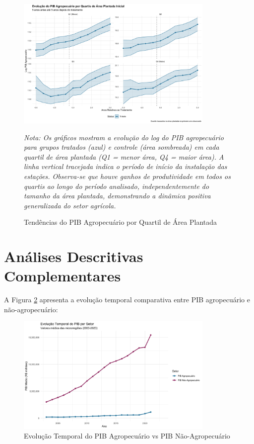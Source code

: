 \documentclass[
	12pt,				%
	oneside,			%
	a4paper,			%
	english,			%
	french,				%
	spanish,			%
	brazil				%
	]{abntex2}
\begin{document}
\begin{apendicesenv}
\begin{figure}[h]
\centering
\caption{Tendências do PIB Agropecuário por Quartil de Área Plantada}
\label{fig:trends_quartile}
\includegraphics[width=0.85\textwidth]{../../../data/outputs/additional_figures/trends_by_size_quartile.png}

\textit{Nota: Os gráficos mostram a evolução do log do PIB agropecuário para grupos tratados (azul) e controle (área sombreada) em cada quartil de área plantada (Q1 = menor área, Q4 = maior área). A linha vertical tracejada indica o período de início da instalação das estações. Observa-se que houve ganhos de produtividade em todos os quartis ao longo do período analisado, independentemente do tamanho da área plantada, demonstrando a dinâmica positiva generalizada do setor agrícola.}
\end{figure}

\section{Análises Descritivas Complementares}

A Figura \ref{fig:evolucao_pib} apresenta a evolução temporal comparativa entre PIB agropecuário e não-agropecuário:

\begin{figure}[h]
\centering
\caption{Evolução Temporal do PIB Agropecuário vs PIB Não-Agropecuário}
\label{fig:evolucao_pib}
\includegraphics[width=0.85\textwidth]{../../../data/outputs/descriptive_analysis/evolucao_temporal_pib.png}


\end{figure}
\end{apendicesenv}
\end{document}
